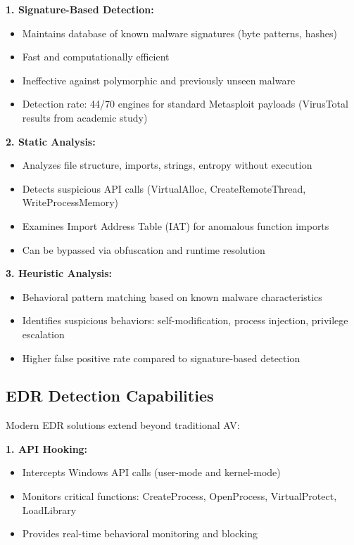 \documentclass[11pt,conference]{IEEEtran}
\begin{document}
\textbf{1. Signature-Based Detection:}
\begin{itemize}
    \item Maintains database of known malware signatures (byte patterns, hashes)
    \item Fast and computationally efficient
    \item Ineffective against polymorphic and previously unseen malware
    \item Detection rate: 44/70 engines for standard Metasploit payloads (VirusTotal results from academic study)
\end{itemize}

\textbf{2. Static Analysis:}
\begin{itemize}
    \item Analyzes file structure, imports, strings, entropy without execution
    \item Detects suspicious API calls (VirtualAlloc, CreateRemoteThread, WriteProcessMemory)
    \item Examines Import Address Table (IAT) for anomalous function imports
    \item Can be bypassed via obfuscation and runtime resolution
\end{itemize}

\textbf{3. Heuristic Analysis:}
\begin{itemize}
    \item Behavioral pattern matching based on known malware characteristics
    \item Identifies suspicious behaviors: self-modification, process injection, privilege escalation
    \item Higher false positive rate compared to signature-based detection
\end{itemize}

\subsection{EDR Detection Capabilities}

Modern EDR solutions extend beyond traditional AV:

\textbf{1. API Hooking:}
\begin{itemize}
    \item Intercepts Windows API calls (user-mode and kernel-mode)
    \item Monitors critical functions: CreateProcess, OpenProcess, VirtualProtect, LoadLibrary
    \item Provides real-time behavioral monitoring and blocking
\end{itemize}
\end{document}
